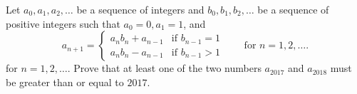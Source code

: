 Let 
$a_0,a_1,a_2,\ldots$
 be a sequence of integers and 
$b_0,b_1,b_2,\ldots$
 be a sequence of 
positive
 integers such that 
$a_0=0,a_1=1$,
 and
\[
a_{n+1} =
        \begin{cases}
            a_nb_n+a_{n-1} & \text{if $b_{n-1}=1$} \\
            a_nb_n-a_{n-1} & \text{if $b_{n-1} >1$}
        \end{cases}\qquad\text{for }n=1,2,\ldots.
\]
for 
$n=1,2,\ldots.$
 Prove that at least one of the two numbers 
$a_{2017}$
 and 
$a_{2018}$
 must be greater than or equal to 
$2017$.
